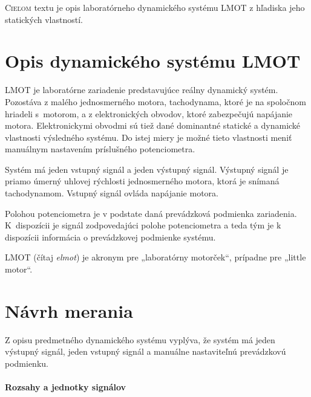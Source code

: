 \documentclass[a4paper, 10pt, ]{article}
\begin{document}
\bigskip

\normalsize
\normalfont

\lstset{style=mystyle}










\noindent
\lettrine[lines=1, nindent=1pt, loversize=0.0]{C}{ieľom} 
textu je opis laboratórneho dynamického systému LMOT z hľadiska jeho statických vlastností.


\section{Opis dynamického systému LMOT}

LMOT je laboratórne zariadenie predstavujúce reálny dynamický systém. Pozostáva z malého jednosmerného motora, tachodynama, ktoré je na spoločnom hriadeli s~motorom, a z elektronických obvodov, ktoré zabezpečujú napájanie motora. Elektronickymi obvodmi sú tiež dané dominantné statické a dynamické vlastnosti výsledného systému. Do istej miery je možné tieto vlastnosti meniť manuálnym nastavením príslušného potenciometra.

Systém má jeden vstupný signál a jeden výstupný signál. Výstupný signál je priamo úmerný uhlovej rýchlosti jednosmerného motora, ktorá je snímaná tachodynamom. Vstupný signál ovláda napájanie motora.

Polohou potenciometra je v podstate daná prevádzková podmienka zariadenia. K~dispozícii je signál zodpovedajúci polohe potenciometra a teda tým je k dispozícii informácia o prevádzkovej podmienke systému.

LMOT (čítaj \emph{elmot}) je akronym pre „laboratórny motorček“, prípadne pre „little motor“.



\section{Návrh merania}

Z opisu predmetného dynamického systému vyplýva, že systém má jeden výstupný signál, jeden vstupný signál a manuálne nastaviteľnú prevádzkovú podmienku.

\paragraph{Rozsahy a jednotky signálov}
\end{document}
